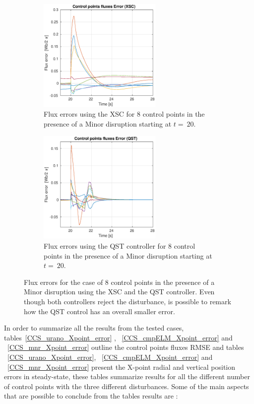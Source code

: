 \begin{figure}[h]
	\centering
	\begin{subfigure}[b]{0.32\textwidth}
		\includegraphics[height=5.5cm] {Chp3/Results_iso/8_gaps_fluxesError_mnr_dsrp.eps}  
		\caption{Flux errors using the XSC for 8 control points in the presence of a Minor disruption starting at $t=~20$.
			\label{FluxErrorXSC} }
	\end{subfigure}
	\hspace{1 cm }
	\begin{subfigure}[b]{0.32\textwidth}
		\includegraphics[height=5.5cm] {Chp3/Results_iso/8_gaps_fluxesError_mnr_dsrpFBC.eps}  
		\caption{ Flux errors using the QST controller for 8 control points in the presence of a Minor disruption starting  at $t=~20$.
			\label{FluxErroFBC} }
	\end{subfigure}
	
	\caption{Flux errors for the case of 8 control points in the presence of a Minor disruption using the XSC and the QST controller. Even though both controllers reject the disturbance, is possible to remark how the QST control has an overall smaller error.  }\label{FluxesError}
\end{figure}


In order to summarize all the results from the tested cases, tables~\ref{CCS_urano_Xpoint_error} , ~\ref{CCS_cmpELM_Xpoint_error} and ~\ref{CCS_mnr_Xpoint_error} outline the control points fluxes RMSE  and tables ~\ref{CCS_urano_Xpoint_error}, ~\ref{CCS_cmpELM_Xpoint_error} and ~\ref{CCS_mnr_Xpoint_error} present the X-point radial and vertical position errors in steady-state, these tables summarize results for all the different number of control points  with the three different disturbances. Some of the main aspects that are  possible to conclude from the tables results are :

